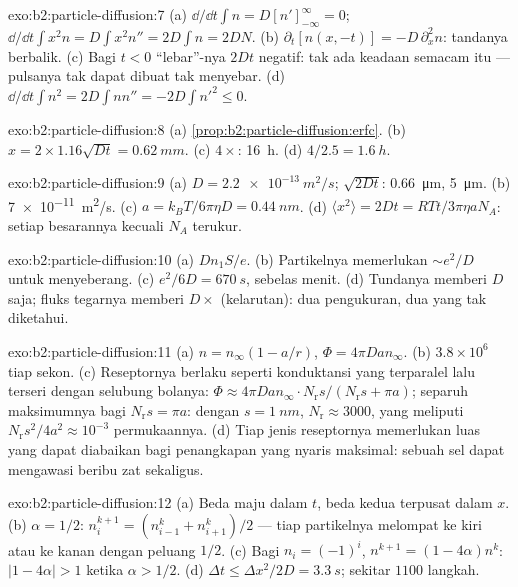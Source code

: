 \begin{solution}{exo:b2:particle-diffusion:7}
(a) $\dd/\dd t\int n = D[n']_{-\infty}^{\infty} = 0$; $\dd/\dd t\int x^2 n = D\int
x^2 n'' = 2D\int n = 2DN$. (b) $\partial_t[n(x,-t)] = -D\,\partial_x^2 n$: tandanya
berbalik. (c) Bagi $t < 0$ ``lebar''-nya $2Dt$ negatif: tak ada keadaan
semacam itu --- pulsanya tak dapat dibuat tak menyebar. (d) $\dd/\dd t\int n^2 = 2D\int nn''
= -2D\int n'^2 \le 0$.
\end{solution}

\begin{solution}{exo:b2:particle-diffusion:8}
(a) \cref{prop:b2:particle-diffusion:erfc}. (b) $x = 2 \times 1.16\sqrt{Dt}
= \qty{0.62}{mm}$. (c) $4\times$: \qty{16}{h}. (d) $4/2.5 = \qty{1.6}{h}$.
\end{solution}

\begin{solution}{exo:b2:particle-diffusion:9}
(a) $D = \qty{2.2e-13}{m^2/s}$; $\sqrt{2Dt}$: \qty{0.66}{\micro m},
\qty{5}{\micro m}. (b) \qty{7e-11}{m^2/s}. (c) $a = k_BT/6\pi\eta D =
\qty{0.44}{nm}$. (d) $\langle x^2\rangle = 2Dt = RTt/3\pi\eta a N_A$: setiap
besarannya kecuali $N_A$ terukur.
\end{solution}

\begin{solution}{exo:b2:particle-diffusion:10}
(a) $Dn_1S/e$. (b) Partikelnya memerlukan $\sim e^2/D$ untuk menyeberang. (c)
$e^2/6D = \qty{670}{s}$, sebelas menit. (d) Tundanya memberi $D$ saja;
fluks tegarnya memberi $D \times$ (kelarutan): dua pengukuran,
dua yang tak diketahui.
\end{solution}

\begin{solution}{exo:b2:particle-diffusion:11}
(a) $n = n_\infty(1 - a/r)$, $\Phi = 4\pi D a n_\infty$. (b) $3.8 \times
10^6$ tiap sekon. (c) Reseptornya berlaku seperti konduktansi yang terparalel lalu
terseri dengan selubung bolanya: $\Phi \approx 4\pi Dan_\infty
\cdot N_{\text{r}}s/(N_{\text{r}}s + \pi a)$; separuh maksimumnya bagi
$N_{\text{r}}s = \pi a$: dengan $s = \qty{1}{nm}$, $N_{\text{r}} \approx
3000$, yang meliputi $N_{\text{r}}s^2/4a^2 \approx 10^{-3}$ permukaannya.
(d) Tiap jenis reseptornya memerlukan luas yang dapat diabaikan bagi penangkapan
yang nyaris maksimal: sebuah sel dapat mengawasi beribu zat sekaligus.
\end{solution}

\begin{solution}{exo:b2:particle-diffusion:12}
(a) Beda maju dalam $t$, beda kedua terpusat dalam $x$. (b)
$\alpha = 1/2$: $n_i^{k+1} = (n_{i-1}^k + n_{i+1}^k)/2$ --- tiap partikelnya melompat
ke kiri atau ke kanan dengan peluang $1/2$. (c) Bagi $n_i = (-1)^i$, $n^{k+1} =
(1 - 4\alpha)n^k$: $|1 - 4\alpha| > 1$ ketika $\alpha > 1/2$. (d) $\Delta t \le
\Delta x^2/2D = \qty{3.3}{s}$; sekitar $1100$ langkah.
\end{solution}

